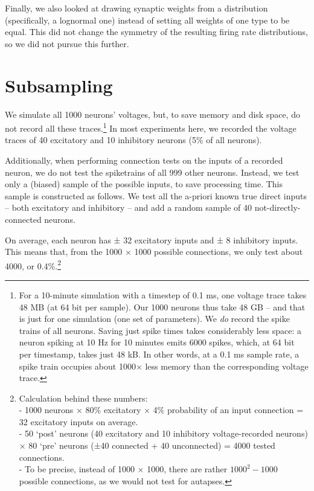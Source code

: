 Finally, we also looked at drawing synaptic weights from a distribution (specifically, a lognormal one) instead of setting all weights of one type to be equal. This did not change the symmetry of the resulting firing rate distributions, so we did not pursue this further.


\section{Subsampling}

We simulate all 1000 neurons' voltages, but, to save memory and disk space,  do not record all these traces.\footnote{
    For a 10-minute simulation with a timestep of 0.1 ms, one voltage trace takes 48 MB (at 64 bit per sample). Our 1000 neurons thus take 48 GB -- and that is just for one simulation (one set of parameters).\newline
    We \emph{do} record the spike trains of all neurons. Saving just spike times takes considerably less space: a neuron spiking at 10 Hz for 10 minutes emits 6000 spikes, which, at 64 bit per timestamp, takes just  48 kB.\newline
    In other words,  at a 0.1 ms sample rate, a spike train occupies about 1000× less memory than the corresponding voltage trace.
}
In most experiments here, we recorded the voltage traces of 40 excitatory and 10 inhibitory neurons (5\% of all neurons).

Additionally, when performing connection tests on the inputs of a recorded neuron, we do not test the spiketrains of all 999 other neurons. Instead, we test only a (biased) sample of the possible inputs, to save processing time.
This sample is constructed as follows. We test all the a-priori known true direct inputs -- both excitatory and inhibitory -- and add a random sample of 40 not-directly-connected neurons.

On average, each neuron has ± 32 excitatory inputs and ± 8 inhibitory inputs. This means that, from the 1000 × 1000 possible connections, we only test about 4000, or 0.4\%.\footnote{
    Calculation behind these numbers:\\
    - 1000 neurons × 80\% excitatory × 4\% probability of an input connection = 32 excitatory inputs on average.\\
    - 50 `post' neurons (40 excitatory and 10 inhibitory voltage-recorded neurons) × 80 `pre' neurons (±40 connected + 40 unconnected) = 4000 tested connections.\\
    - To be precise, instead of 1000 × 1000, there are rather  $1000^2 - 1000$ possible connections, as we would not test for autapses.
}

